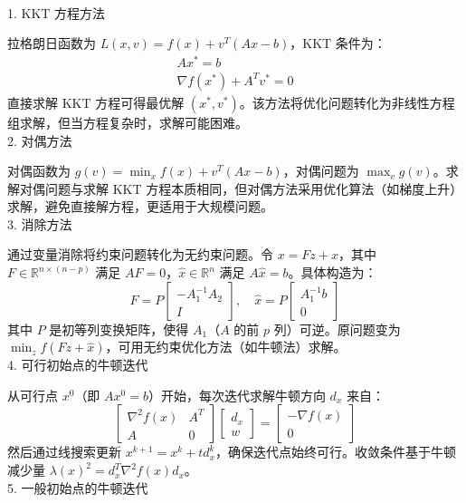\documentclass{article}
\newenvironment{solution_cn}{%
  \begin{proof}[解答]%
  \kaishu  %
}{%
  \end{proof}%
}
\begin{document}
\begin{solution_cn} 
\quad \\1. KKT 方程方法

拉格朗日函数为 \(L(x, v) = f(x) + v^T(Ax - b)\)，KKT 条件为：
\[
\begin{gathered}
Ax^* = b \\
\nabla f(x^*) + A^T v^* = 0
\end{gathered}
\]
直接求解 KKT 方程可得最优解 \((x^*, v^*)\)。该方法将优化问题转化为非线性方程组求解，但当方程复杂时，求解可能困难。\\
2. 对偶方法

对偶函数为 \(g(v) = \min_x f(x) + v^T(Ax - b)\)，对偶问题为 \(\max_v g(v)\)。求解对偶问题与求解 KKT 方程本质相同，但对偶方法采用优化算法（如梯度上升）求解，避免直接解方程，更适用于大规模问题。\\
3. 消除方法

通过变量消除将约束问题转化为无约束问题。令 \(x = Fz + \hat{x}\)，其中 \(F \in \mathbb{R}^{n \times (n-p)}\) 满足 \(AF = 0\)，\(\hat{x} \in \mathbb{R}^n\) 满足 \(A\hat{x} = b\)。具体构造为：
\[
F = P \begin{bmatrix} -A_1^{-1}A_2 \\ I \end{bmatrix}, \quad \hat{x} = P \begin{bmatrix} A_1^{-1}b \\ 0 \end{bmatrix}
\]
其中 \(P\) 是初等列变换矩阵，使得 \(A_1\)（\(A\) 的前 \(p\) 列）可逆。原问题变为 \(\min_z f(Fz + \hat{x})\)，可用无约束优化方法（如牛顿法）求解。\\
4. 可行初始点的牛顿迭代

从可行点 \(x^0\)（即 \(Ax^0 = b\)）开始，每次迭代求解牛顿方向 \(d_x\) 来自：
\[
\begin{bmatrix}
\nabla^2 f(x) & A^T \\
A & 0
\end{bmatrix}
\begin{bmatrix}
d_x \\
w
\end{bmatrix}
=
\begin{bmatrix}
-\nabla f(x) \\
0
\end{bmatrix}
\]
然后通过线搜索更新 \(x^{k+1} = x^k + t d_x^k\)，确保迭代点始终可行。收敛条件基于牛顿减少量 \(\lambda(x)^2 = d_x^T \nabla^2 f(x) d_x\)。\\
5. 一般初始点的牛顿迭代


\end{solution_cn}
\end{document}
